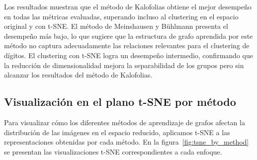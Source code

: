 \documentclass{article}
\begin{document}
Los resultados muestran que el método de Kalofolias obtiene el mejor desempeño en todas las métricas evaluadas, superando incluso al clustering en el espacio original y con t-SNE. El método de Meinshausen y Bühlmann presenta el desempeño más bajo, lo que sugiere que la estructura de grafo aprendida por este método no captura adecuadamente las relaciones relevantes para el clustering de dígitos. El clustering con t-SNE logra un desempeño intermedio, confirmando que la reducción de dimensionalidad mejora la separabilidad de los grupos pero sin alcanzar los resultados del método de Kalofolias.

\subsection{Visualización en el plano t-SNE por método}
Para visualizar cómo los diferentes métodos de aprendizaje de grafos afectan la distribución de las imágenes en el espacio reducido, aplicamos t-SNE a las representaciones obtenidas por cada método. En la figura~\ref{fig:tsne_by_method} se presentan las visualizaciones t-SNE correspondientes a cada enfoque.
\end{document}
